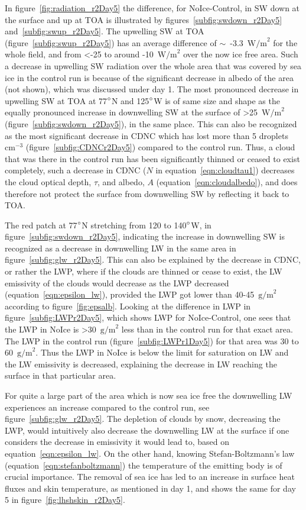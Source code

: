 In figure~\ref{fig:radiation_r2Day5} the difference, for NoIce-Control, in SW down at the surface and up at TOA is illustrated by figures~\ref{subfig:swdown_r2Day5} and~\ref{subfig:swup_r2Day5}. The upwelling SW at TOA (figure~\ref{subfig:swup_r2Day5}) has an average difference of $\sim$~-3.3~$\text{W/m}^2$ for the whole field, and from <-25 to around -10~$\text{W/m}^2$ over the now ice free area. Such a decrease in upwelling SW radiation over the whole area that was covered by sea ice in the control run is because of the significant decrease in albedo of the area (not shown), which was discussed under day 1. The most pronounced decrease in upwelling SW at TOA at 77$\degree$N and 125$\degree$W is of same size and shape as the equally pronounced increase in downwelling SW at the surface of >25~$\text{W/m}^2$ (figure~\ref{subfig:swdown_r2Day5}), in the same place. This can also be recognized as the most significant decrease in CDNC which has lost more than 5 droplets~$\text{cm}^{-3}$ (figure~\ref{subfig:CDNCr2Day5}) compared to the control run. Thus, a cloud that was there in the control run has been significantly thinned or ceased to exist completely, such a decrease in CDNC ($N$ in equation~\ref{eqn:cloudtau1}) decreases the cloud optical depth, $\tau$, and albedo, $A$ (equation~\ref{eqn:cloudalbedo}), and does therefore not protect the surface from downwelling SW by reflecting it back to TOA.

The red patch at 77$\degree$N stretching from 120 to 140$\degree$W, in figure~\ref{subfig:swdown_r2Day5}, indicating the increase in downwelling SW is recognized as a decrease in downwelling LW in the same area in figure~\ref{subfig:glw_r2Day5}. This can also be explained by the decrease in CDNC, or rather the LWP, where if the clouds are thinned or cease to exist, the LW emissivity of the clouds would decrease as the LWP decreased (equation~\ref{eqn:epsilon_lw}), provided the LWP got lower than 40-45~$\text{g/m}^2$ according to figure~\ref{fig:epsalb}. Looking at the difference in LWP in figure~\ref{subfig:LWPr2Day5}, which shows LWP for NoIce-Control, one sees that the LWP in NoIce is >30~$\text{g/m}^2$ less than in the control run for that exact area. The LWP in the control run (figure~\ref{subfig:LWPr1Day5}) for that area was 30 to 60~$\text{g/m}^2$. Thus the LWP in NoIce is below the limit for saturation on LW and the LW emissivity is decreased, explaining the decrease in LW reaching the surface in that particular area.

For quite a large part of the area which is now sea ice free the downwelling LW experiences an increase compared to the control run, see figure~\ref{subfig:glw_r2Day5}. The depletion of clouds by snow, decreasing the LWP, would intuitively also decrease the downwelling LW at the surface if one considers the decrease in emissivity it would lead to, based on equation~\ref{eqn:epsilon_lw}. On the other hand, knowing Stefan-Boltzmann's law (equation~\ref{eqn:stefanboltzmann}) the temperature of the emitting body is of crucial importance. The removal of sea ice has led to an increase in surface heat fluxes and skin temperature, as mentioned in day 1, and shows the same for day 5 in figure~\ref{fig:lhshskin_r2Day5}.

